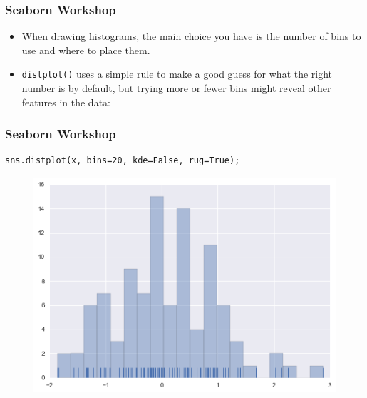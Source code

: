 \documentclass{beamer}
\begin{document}
\begin{frame}[fragile]
	\frametitle{Seaborn Workshop}
	\large
	\begin{itemize}
\item When drawing histograms, the main choice you have is the number of bins to use and where to place them.
\item  \texttt{distplot()} uses a simple rule to make a good guess for what the right number is by default, but trying more or fewer bins might reveal other features in the data:
	\end{itemize}


\end{frame}
\begin{frame}[fragile]
		\frametitle{Seaborn Workshop}
		\large
\begin{verbatim}
sns.distplot(x, bins=20, kde=False, rug=True);
\end{verbatim}

\begin{figure}
	\centering
	\includegraphics[width=0.7\linewidth]{images/distributions_12_0}
\end{figure}
\end{frame}

\end{document}
